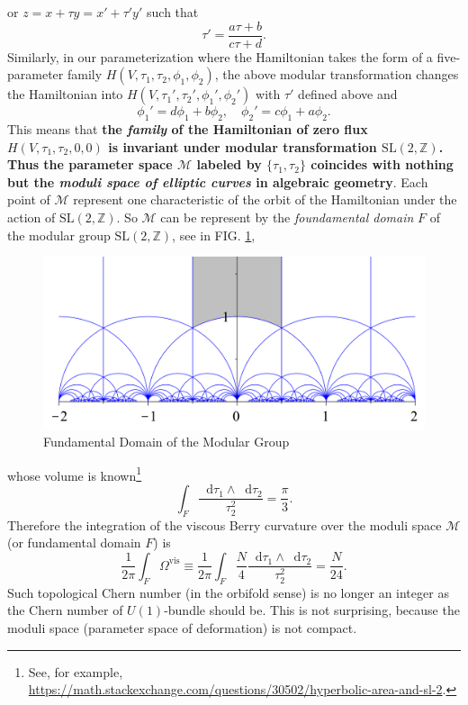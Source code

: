 \documentclass[10pt,nofootinbib,letterpaper]{revtex4}
\newcommand*\dd{\mathop{}\!\mathrm{d}}
\begin{document}
		or $z=x+\tau y=x'+\tau'y'$ such that 
		\begin{equation*}
			\tau'=\dfrac{a\tau+b}{c\tau+d}.
		\end{equation*}
		\indent Similarly, in our parameterization where the Hamiltonian takes the form of a five-parameter family $H(V,\tau_1,\tau_2,\phi_1,\phi_2)$, the above modular transformation changes the Hamiltonian into $H(V,\tau_1',\tau_2',\phi_1',\phi_2')$ with $\tau'$ defined above and
		\begin{equation*}
		 	\phi_1'=d\phi_1+b\phi_2,\quad \phi_2'=c\phi_1+a\phi_2.
		\end{equation*}
		This means that \textbf{\color{red}the \emph{family} of the Hamiltonian of zero flux $H(V,\tau_1,\tau_2,0,0)$ is invariant under modular transformation $\mathrm{SL}(2,\mathbb{Z})$. Thus the parameter space $\mathcal{M}$ labeled by $\{\tau_1,\tau_2\}$ coincides with nothing but the \emph{moduli space of elliptic curves} in algebraic geometry}. Each point of $\mathcal{M}$ represent one characteristic of the orbit of the Hamiltonian under the action of $\mathrm{SL}(2,\mathbb{Z})$. So $\mathcal{M}$ can be represent by the \emph{foundamental domain} $F$ of the modular group $\mathrm{SL}(2,\mathbb{Z})$, see in FIG. \ref{fig:FD},
		\begin{figure}[!htp]
			\centering
			\includegraphics[scale=0.15]{SL2.png}
			\caption{Fundamental Domain of the Modular Group}
			\label{fig:FD}
		\end{figure}
		whose volume is known\footnote{See, for example, \url{https://math.stackexchange.com/questions/30502/hyperbolic-area-and-sl-2}.}
		\begin{equation}\label{3.2.1}
			\int_F\dfrac{\dd\tau_1\wedge\dd\tau_2}{\tau_2^2}=\dfrac{\pi}{3}.
		\end{equation}
		Therefore the integration of the viscous Berry curvature over the moduli space $\mathcal{M}$ (or fundamental domain $F$) is
		\begin{equation}\label{3.2.2}
			\dfrac{1}{2\pi}\int_F\Omega^{\text{vis}}\equiv\dfrac{1}{2\pi}\int_F\dfrac{N}{4}\dfrac{\dd\tau_1\wedge\dd\tau_2}{\tau_2^2}=\dfrac{N}{24}.
		\end{equation}
		Such topological Chern number (in the orbifold sense) is no longer an integer as the Chern number of $U(1)$-bundle should be. This is not surprising, because the moduli space (parameter space of deformation) is not compact.



\end{document}
